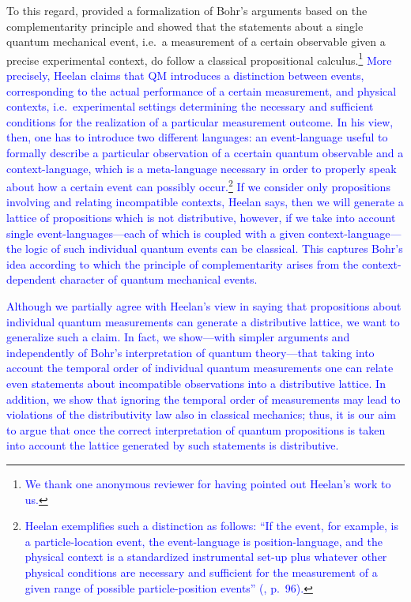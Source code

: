 \documentclass[11pt, executivepaper]{article}
\begin{document}
{To this regard, \cite{Heelan:1970} provided a formalization of Bohr's arguments based on the complementarity principle and showed that the statements about a single quantum mechanical event, i.e.\ a measurement of a certain observable given a precise experimental context, do follow a classical propositional calculus.}\footnote{\textcolor{blue}{We thank one anonymous reviewer for having pointed out Heelan's work to us.}} \textcolor{blue}{More precisely, Heelan claims that QM introduces a distinction between events, corresponding to the actual performance of a certain measurement, and physical contexts, i.e.\ experimental settings determining the necessary and sufficient conditions for the realization of a particular measurement outcome. In his view, then, one has to introduce two different languages: an event-language useful to formally describe a particular observation of a ccertain quantum observable and a context-language, which is a meta-language necessary in order to properly speak about how a certain event can possibly occur.\footnote{\textcolor{blue}{Heelan exemplifies such a distinction as follows: ``If the event, for example, is a particle-location event, the event-language is position-language, and the physical context is a standardized instrumental set-up plus whatever other physical conditions are necessary and sufficient for the measurement of a given range of possible particle-position events'' (\cite{Heelan:1970}, p.\ 96).}} If we consider only propositions involving and relating incompatible contexts, Heelan says, then we will generate a lattice of propositions which is not distributive, however, if we take into account single event-languages---each of which is coupled with a given context-language---the logic of such individual quantum events can be classical. This captures Bohr's idea according to which the principle of complementarity arises from the context-dependent character of quantum mechanical events.}

\textcolor{blue}{Although we partially agree with Heelan's view in saying that propositions about individual quantum measurements can generate a distributive lattice, we want to generalize such a claim. In fact, we show---with simpler arguments and independently of Bohr's interpretation of quantum theory---that taking into account the temporal order of individual quantum measurements one can relate even statements about incompatible observations into a distributive lattice. In addition, we show that ignoring the temporal order of measurements may lead to violations of the distributivity law also in classical mechanics; thus, it is our aim to argue that once the correct interpretation of quantum propositions is taken into account the lattice generated by such statements is distributive.}
\end{document}
